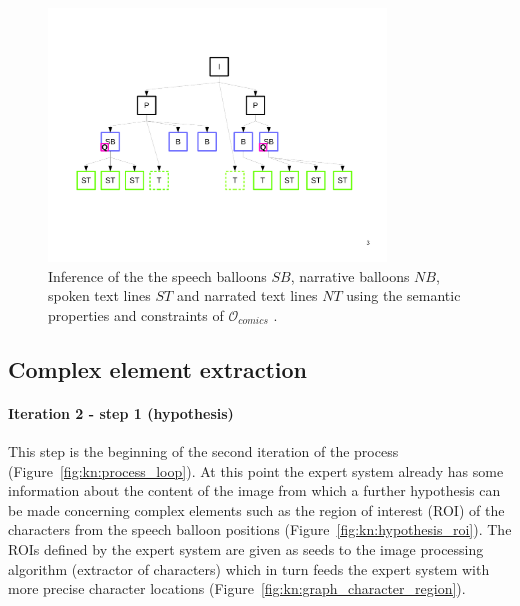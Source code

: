  \begin{figure}[!ht]  %
   \centering
  \includegraphics[trim= 30px 168px 20px 110px, clip, width=0.8\textwidth]{graph_infer_1.pdf}
  \caption[Inference of the speech balloons, narrative balloons, spoken text lines and narrated text lines using the semantic properties of the knowledge base]{Inference of the the speech balloons $SB$, narrative balloons $NB$, spoken text lines $ST$ and narrated text lines $NT$ using the semantic properties and constraints of $\mathcal{O}_{comics}$ .
  }
  \label{fig:kn:graph_specific_types}
 \end{figure}


\subsection{Complex element extraction} %
\label{sub:complex_element_extraction}

\paragraph{Iteration 2 - step 1 (hypothesis)} %
\label{par:step_4}
This step is the beginning of the second iteration of the process (Figure~\ref{fig:kn:process_loop}).
At this point the expert system already has some information about the content of the image from which a further hypothesis can be made concerning complex elements such as the region of interest (ROI) of the characters from the speech balloon positions (Figure~\ref{fig:kn:hypothesis_roi}).
The ROIs defined by the expert system are given as seeds to the image processing algorithm (extractor of characters) which in turn feeds the expert system with more precise character locations (Figure~\ref{fig:kn:graph_character_region}).

